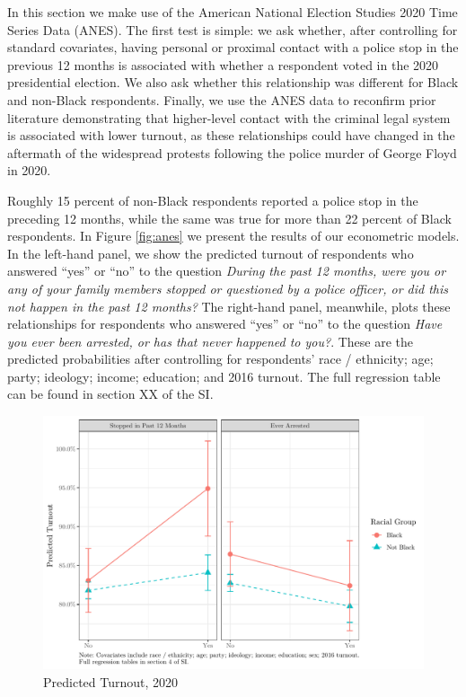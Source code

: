 \documentclass[
  12pt,
]{article}
\begin{document}
In this section we make use of the American National Election Studies 2020 Time Series Data (ANES). The first test is simple: we ask whether, after controlling for standard covariates, having personal or proximal contact with a police stop in the previous 12 months is associated with whether a respondent voted in the 2020 presidential election. We also ask whether this relationship was different for Black and non-Black respondents. Finally, we use the ANES data to reconfirm prior literature demonstrating that higher-level contact with the criminal legal system is associated with lower turnout, as these relationships could have changed in the aftermath of the widespread protests following the police murder of George Floyd in 2020.

Roughly 15 percent of non-Black respondents reported a police stop in the preceding 12 months, while the same was true for more than 22 percent of Black respondents. In Figure \ref{fig:anes} we present the results of our econometric models. In the left-hand panel, we show the predicted turnout of respondents who answered ``yes'' or ``no'' to the question \emph{During the past 12 months, were you or any of your family members stopped or questioned by a police officer, or did this not happen in the past 12 months?} The right-hand panel, meanwhile, plots these relationships for respondents who answered ``yes'' or ``no'' to the question \emph{Have you ever been arrested, or has that never happened to you?}. These are the predicted probabilities after controlling for respondents' race / ethnicity; age; party; ideology; income; education; and 2016 turnout. The full regression table can be found in section XX of the SI.

\begin{figure}[!htpb]

{\centering \includegraphics{draft_paper_files/figure-latex/anes-cross-1} 

}

\caption{\label{fig:anes}Predicted Turnout, 2020}\label{fig:anes-cross}
\end{figure}
\end{document}
